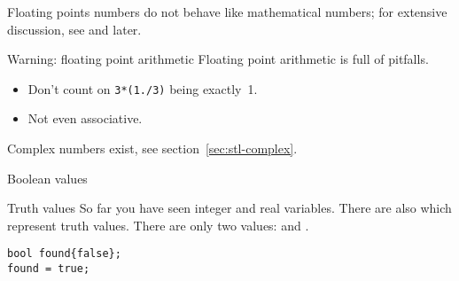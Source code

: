 Floating points numbers do not behave like mathematical numbers;
for extensive discussion, see  and later.

\begin{block}{Warning: floating point arithmetic}
  \label{sl:float-arith}
  Floating point arithmetic is full of pitfalls.
  \begin{itemize}
  \item Don't count on \lstinline{3*(1./3)} being exactly~1.
  \item Not even associative.
  \end{itemize}
\end{block}

\begin{comment}
  The following exercise illustrates another point about computer numbers.

  \begin{exercise}
    \label{ex:macheps}
    Define 
    \begin{lstlisting}
      float one = 1.;
    \end{lstlisting}
    and
    \begin{enumerate}
    \item Read a \lstinline{float eps},
    \item Make a new variable that has the value \lstinline{one+eps}. Print
      this.
    \item Make another variable that is the previous one minus
      \lstinline{one}. Print the result again.
    \item Test your program with \lstinline{.001}, \lstinline{.0001}, \lstinline{.00001},
      \lstinline{000001}. Do you understand the result?
    \end{enumerate}
  \end{exercise}
\end{comment}

Complex numbers exist, see section~\ref{sec:stl-complex}.

 {Boolean values}

\begin{block}{Truth values}
  \label{sl:bool-var}
  So far you have seen integer and real variables. There are also
   which represent truth values. There are
  only two values:  and .
\begin{lstlisting}
bool found{false};
found = true;
\end{lstlisting}
\end{block}

